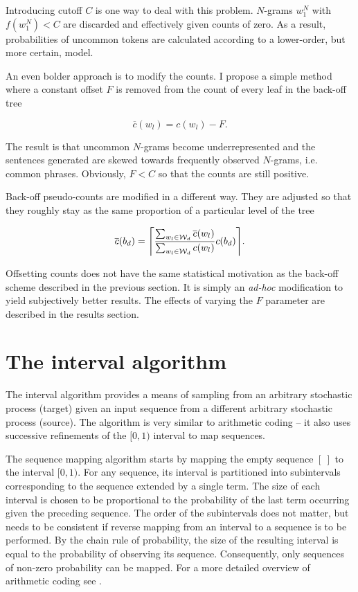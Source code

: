 \documentclass[draft]{IIBproject}
\makeatletter
\DeclarePairedDelimiter{\ceil}{\lceil}{\rceil}
\DeclareRobustCommand*{\ie}{i.e.\@\xspace}
\makeatother
\begin{document}
Introducing cutoff $C$ is one way to deal with this problem. $N$-grams $w_1^N$ with $f(w_1^N) < C$ are discarded and effectively given counts of zero. As a result, probabilities of uncommon tokens are calculated according to a lower-order, but more certain, model.

An even bolder approach is to modify the counts. I propose a simple method where a constant offset $F$ is removed from the count of every leaf in the back-off tree

\begin{equation}
\label{eq:offsetting_leaves}
\overline c(w_l) = c(w_l) - F .
\end{equation}

The result is that uncommon $N$-grams become underrepresented and the sentences generated are skewed towards frequently observed $N$-grams, \ie common phrases. Obviously, $F<C$ so that the counts are still positive.

Back-off pseudo-counts are modified in a different way. They are adjusted so that they roughly stay as the same proportion of a particular level of the tree

\begin{equation}
\label{eq:adjusting_backoff_pseudocounts}
\overline c(b_d) = \ceil*{ \frac {\sum_{w_l \in \mathcal W_d} \overline c(w_l)} {\sum_{w_l \in \mathcal W_d} c(w_l)} c(b_d) }.
\end{equation}

Offsetting counts does not have the same statistical motivation as the back-off scheme described in the previous section. It is simply an \emph{ad-hoc} modification to yield subjectively better results. The effects of varying the $F$ parameter are described in the results section.

\clearpage
\section{The interval algorithm}
\label{sec:interval_algorithm}

The interval algorithm \cite{hanhoshi1997} provides a means of sampling from an arbitrary stochastic process (target) given an input sequence from a different arbitrary stochastic process (source). The algorithm is very similar to arithmetic coding -- it also uses successive refinements of the $[0,1)$ interval to map sequences.

The sequence mapping algorithm starts by mapping the empty sequence $[~]$ to the interval $[0,1)$. For any sequence, its interval is partitioned into subintervals corresponding to the sequence extended by a single term. The size of each interval is chosen to be proportional to the probability of the last term occurring given the preceding sequence. The order of the subintervals does not matter, but needs to be consistent if reverse mapping from an interval to a sequence is to be performed. By the chain rule of probability, the size of the resulting interval is equal to the probability of observing its sequence. Consequently, only sequences of non-zero probability can be mapped. For a more detailed overview of arithmetic coding see \cite{coverthomas:sfecoding,said2004introduction}.
\end{document}
